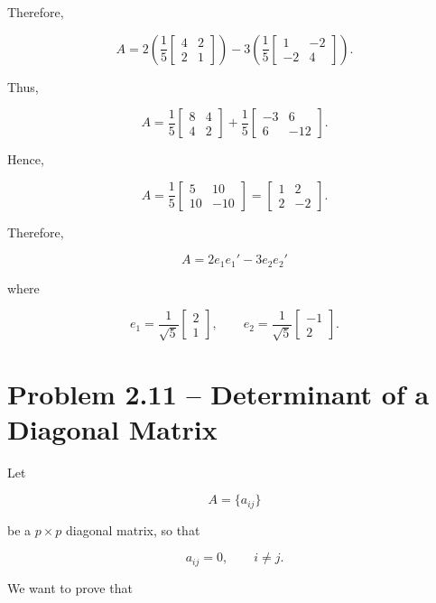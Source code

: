 \documentclass[12pt]{article}
\begin{document}
Therefore,

\[
A
=
2
\left(
\frac{1}{5}
\begin{bmatrix}
4&2\\
2&1
\end{bmatrix}
\right)
-
3
\left(
\frac{1}{5}
\begin{bmatrix}
1&-2\\
-2&4
\end{bmatrix}
\right).
\]

Thus,

\[
A
=
\frac{1}{5}
\begin{bmatrix}
8&4\\
4&2
\end{bmatrix}
+
\frac{1}{5}
\begin{bmatrix}
-3&6\\
6&-12
\end{bmatrix}.
\]

Hence,

\[
A
=
\frac{1}{5}
\begin{bmatrix}
5&10\\
10&-10
\end{bmatrix}
=
\begin{bmatrix}
1&2\\
2&-2
\end{bmatrix}.
\]

Therefore,

\[
\boxed{
A=2e_1e_1'-3e_2e_2'
}
\]

where

\[
\boxed{
e_1=
\frac{1}{\sqrt5}
\begin{bmatrix}
2\\
1
\end{bmatrix},
\qquad
e_2=
\frac{1}{\sqrt5}
\begin{bmatrix}
-1\\
2
\end{bmatrix}.
}
\]

\section*{Problem 2.11 -- Determinant of a Diagonal Matrix}

Let

\[
A=\{a_{ij}\}
\]

be a $p\times p$ diagonal matrix, so that

\[
a_{ij}=0,\qquad i\neq j.
\]

We want to prove that
\end{document}
